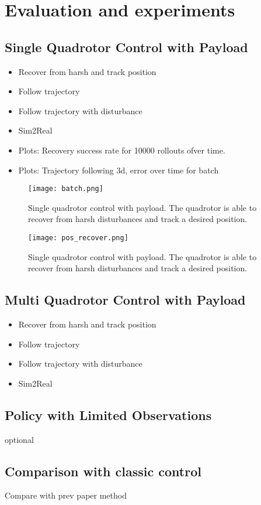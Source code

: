 \chapter{Evaluation and experiments}
\section{Single Quadrotor Control with Payload}
\begin{itemize}
    \item Recover from harsh and track position
    \item Follow trajectory
    \item Follow trajectory with disturbance
    \item Sim2Real
    \item Plots: Recovery success rate for 10000 rollouts ofver time.
    \item Plots: Trajectory following 3d, error over time for batch

\end{itemize}
\begin{figure}
    \centering
    \texttt{[image: batch.png]}
    \caption{Single quadrotor control with payload. The quadrotor is able to recover from harsh disturbances and track a desired position.}
    \label{fig:single_quadrotor_control}
\end{figure}
\begin{figure}
    \centering
    \texttt{[image: pos\_recover.png]}
    \caption{Single quadrotor control with payload. The quadrotor is able to recover from harsh disturbances and track a desired position.}
    \label{fig:single_quadrotor_control}
\end{figure}
\section{Multi Quadrotor Control with Payload}
\begin{itemize}
    \item Recover from harsh and track position
    \item Follow trajectory
    \item Follow trajectory with disturbance
    \item Sim2Real
\end{itemize}
\section{Policy with Limited Observations}
optional
\section{Comparison with classic control}
Compare with prev paper method \autocite{Wahba2024}
